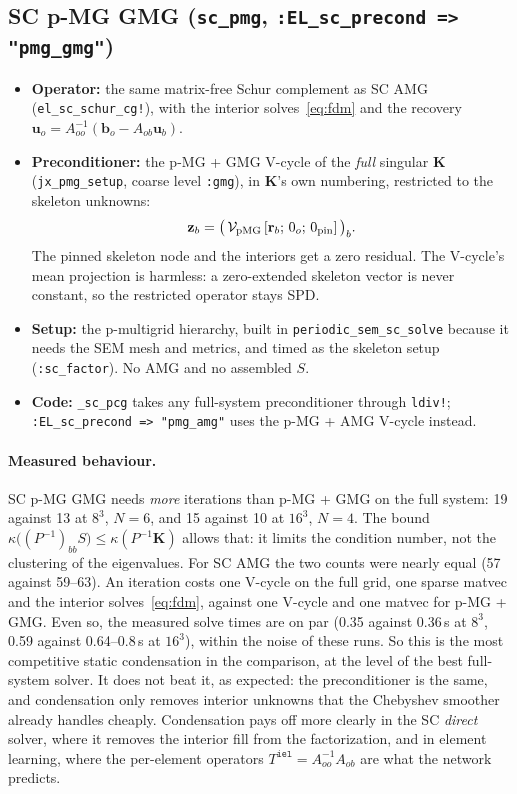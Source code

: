 \documentclass[11pt]{article}
\newcommand{\iel}{\mathtt{iel}}
\newcommand{\K}{\mathbf{K}}
\newcommand{\uu}{\mathbf{u}}
\newcommand{\bb}{\mathbf{b}}
\newcommand{\rr}{\mathbf{r}}
\newcommand{\zz}{\mathbf{z}}
\newcommand{\code}[1]{\texttt{#1}}
\begin{document}
\subsection{SC p-MG GMG (\code{sc\_pmg}, \code{:EL\_sc\_precond => "pmg\_gmg"})}
\begin{itemize}
  \item \textbf{Operator:} the same matrix-free Schur complement as SC AMG (\code{el\_sc\_schur\_cg!}), with the
        interior solves~\eqref{eq:fdm} and the recovery $\uu_o=A_{oo}^{-1}(\bb_o-A_{ob}\uu_b)$.
  \item \textbf{Preconditioner:} the p-MG + GMG V-cycle of the \emph{full} singular $\K$ (\code{jx\_pmg\_setup}, coarse
        level \code{:gmg}), in $\K$'s own numbering, restricted to the skeleton unknowns:
        \[
          \zz_b = \big(\,\mathcal{V}_{\rm pMG}\,[\rr_b;\,0_o;\,0_{\rm pin}]\,\big)_b .
        \]
        The pinned skeleton node and the interiors get a zero residual. The V-cycle's mean projection is harmless:
        a zero-extended skeleton vector is never constant, so the restricted operator stays SPD.
  \item \textbf{Setup:} the p-multigrid hierarchy, built in \code{periodic\_sem\_sc\_solve} because it needs the SEM
        mesh and metrics, and timed as the skeleton setup (\code{:sc\_factor}). No AMG and no assembled $S$.
  \item \textbf{Code:} \code{\_sc\_pcg} takes any full-system preconditioner through \code{ldiv!};
        \code{:EL\_sc\_precond => "pmg\_amg"} uses the p-MG + AMG V-cycle instead.
\end{itemize}

\paragraph{Measured behaviour.} SC p-MG GMG needs \emph{more} iterations than p-MG + GMG on the full system:
19 against 13 at $8^3$, $N=6$, and 15 against 10 at $16^3$, $N=4$. The bound
$\kappa\big((P^{-1})_{bb}S\big)\le\kappa(P^{-1}\K)$ allows that: it limits the condition number, not the clustering of the
eigenvalues. For SC AMG the two counts were nearly equal (57 against 59--63). An iteration costs one V-cycle on the
full grid, one sparse matvec and the interior solves~\eqref{eq:fdm}, against one V-cycle and one matvec for p-MG +
GMG. Even so, the measured solve times are on par (0.35 against 0.36\,s at $8^3$, 0.59 against 0.64--0.8\,s at $16^3$),
within the noise of these runs. So this is the most competitive static condensation in the comparison, at the
level of the best full-system solver. It does not beat it, as expected: the preconditioner is the same, and
condensation only removes interior unknowns that the Chebyshev smoother already handles cheaply. Condensation
pays off more clearly in the SC \emph{direct} solver, where it removes the interior fill from the factorization,
and in element learning, where the per-element operators $T^{\iel}=A_{oo}^{-1}A_{ob}$ are what the network predicts.
\end{document}
